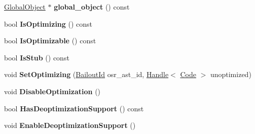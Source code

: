 \begin{DoxyCompactItemize}
\item 
\hypertarget{classv8_1_1internal_1_1_compilation_info_a76a6ede87560cb59411c41b96654c63d}{}\hyperlink{classv8_1_1internal_1_1_global_object}{Global\+Object} $\ast$ {\bfseries global\+\_\+object} () const \label{classv8_1_1internal_1_1_compilation_info_a76a6ede87560cb59411c41b96654c63d}

\item 
\hypertarget{classv8_1_1internal_1_1_compilation_info_adc73261da340781b8b628ee26ed3bcb3}{}bool {\bfseries Is\+Optimizing} () const \label{classv8_1_1internal_1_1_compilation_info_adc73261da340781b8b628ee26ed3bcb3}

\item 
\hypertarget{classv8_1_1internal_1_1_compilation_info_a0d5b1d65d5cfad937f4ff060b2535983}{}bool {\bfseries Is\+Optimizable} () const \label{classv8_1_1internal_1_1_compilation_info_a0d5b1d65d5cfad937f4ff060b2535983}

\item 
\hypertarget{classv8_1_1internal_1_1_compilation_info_a82cef8b697accb2cd81e2ec5402c5855}{}bool {\bfseries Is\+Stub} () const \label{classv8_1_1internal_1_1_compilation_info_a82cef8b697accb2cd81e2ec5402c5855}

\item 
\hypertarget{classv8_1_1internal_1_1_compilation_info_a83f7a3a265c269da611625159c835032}{}void {\bfseries Set\+Optimizing} (\hyperlink{classv8_1_1internal_1_1_bailout_id}{Bailout\+Id} osr\+\_\+ast\+\_\+id, \hyperlink{classv8_1_1internal_1_1_handle}{Handle}$<$ \hyperlink{classv8_1_1internal_1_1_code}{Code} $>$ unoptimized)\label{classv8_1_1internal_1_1_compilation_info_a83f7a3a265c269da611625159c835032}

\item 
\hypertarget{classv8_1_1internal_1_1_compilation_info_af839ed6b5521731909ea648e19c95c36}{}void {\bfseries Disable\+Optimization} ()\label{classv8_1_1internal_1_1_compilation_info_af839ed6b5521731909ea648e19c95c36}

\item 
\hypertarget{classv8_1_1internal_1_1_compilation_info_ae22ffec25c42c1f64eb0d72dea45c6ea}{}bool {\bfseries Has\+Deoptimization\+Support} () const \label{classv8_1_1internal_1_1_compilation_info_ae22ffec25c42c1f64eb0d72dea45c6ea}

\item 
\hypertarget{classv8_1_1internal_1_1_compilation_info_a2a6e12c34281ac4239fa5a40ea4b5a53}{}void {\bfseries Enable\+Deoptimization\+Support} ()\label{classv8_1_1internal_1_1_compilation_info_a2a6e12c34281ac4239fa5a40ea4b5a53}


\end{DoxyCompactItemize}
